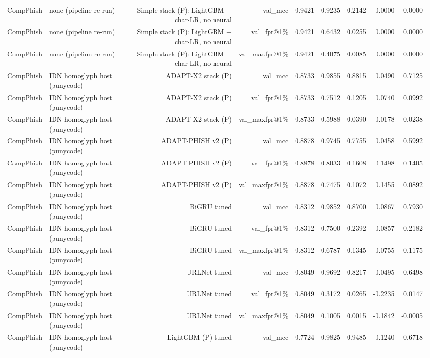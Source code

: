 \begin{table}[t]
\begin{tabular}{llrrrrrrr}
CompPhish & none (pipeline re-run) & Simple stack (P): LightGBM + char-LR, no neural & val\_mcc & 0.9421 & 0.9235 & 0.2142 & 0.0000 & 0.0000 \\
CompPhish & none (pipeline re-run) & Simple stack (P): LightGBM + char-LR, no neural & val\_fpr@1\% & 0.9421 & 0.6432 & 0.0255 & 0.0000 & 0.0000 \\
CompPhish & none (pipeline re-run) & Simple stack (P): LightGBM + char-LR, no neural & val\_maxfpr@1\% & 0.9421 & 0.4075 & 0.0085 & 0.0000 & 0.0000 \\
CompPhish & IDN homoglyph host (punycode) & ADAPT-X2 stack (P) & val\_mcc & 0.8733 & 0.9855 & 0.8815 & 0.0490 & 0.7125 \\
CompPhish & IDN homoglyph host (punycode) & ADAPT-X2 stack (P) & val\_fpr@1\% & 0.8733 & 0.7512 & 0.1205 & 0.0740 & 0.0992 \\
CompPhish & IDN homoglyph host (punycode) & ADAPT-X2 stack (P) & val\_maxfpr@1\% & 0.8733 & 0.5988 & 0.0390 & 0.0178 & 0.0238 \\
CompPhish & IDN homoglyph host (punycode) & ADAPT-PHISH v2 (P) & val\_mcc & 0.8878 & 0.9745 & 0.7755 & 0.0458 & 0.5992 \\
CompPhish & IDN homoglyph host (punycode) & ADAPT-PHISH v2 (P) & val\_fpr@1\% & 0.8878 & 0.8033 & 0.1608 & 0.1498 & 0.1405 \\
CompPhish & IDN homoglyph host (punycode) & ADAPT-PHISH v2 (P) & val\_maxfpr@1\% & 0.8878 & 0.7475 & 0.1072 & 0.1455 & 0.0892 \\
CompPhish & IDN homoglyph host (punycode) & BiGRU tuned & val\_mcc & 0.8312 & 0.9852 & 0.8700 & 0.0867 & 0.7930 \\
CompPhish & IDN homoglyph host (punycode) & BiGRU tuned & val\_fpr@1\% & 0.8312 & 0.7500 & 0.2392 & 0.0857 & 0.2182 \\
CompPhish & IDN homoglyph host (punycode) & BiGRU tuned & val\_maxfpr@1\% & 0.8312 & 0.6787 & 0.1345 & 0.0755 & 0.1175 \\
CompPhish & IDN homoglyph host (punycode) & URLNet tuned & val\_mcc & 0.8049 & 0.9692 & 0.8217 & 0.0495 & 0.6498 \\
CompPhish & IDN homoglyph host (punycode) & URLNet tuned & val\_fpr@1\% & 0.8049 & 0.3172 & 0.0265 & -0.2235 & 0.0147 \\
CompPhish & IDN homoglyph host (punycode) & URLNet tuned & val\_maxfpr@1\% & 0.8049 & 0.1005 & 0.0015 & -0.1842 & -0.0005 \\
CompPhish & IDN homoglyph host (punycode) & LightGBM (P) tuned & val\_mcc & 0.7724 & 0.9825 & 0.9485 & 0.1240 & 0.6718 \\

\end{tabular}
\end{table}
